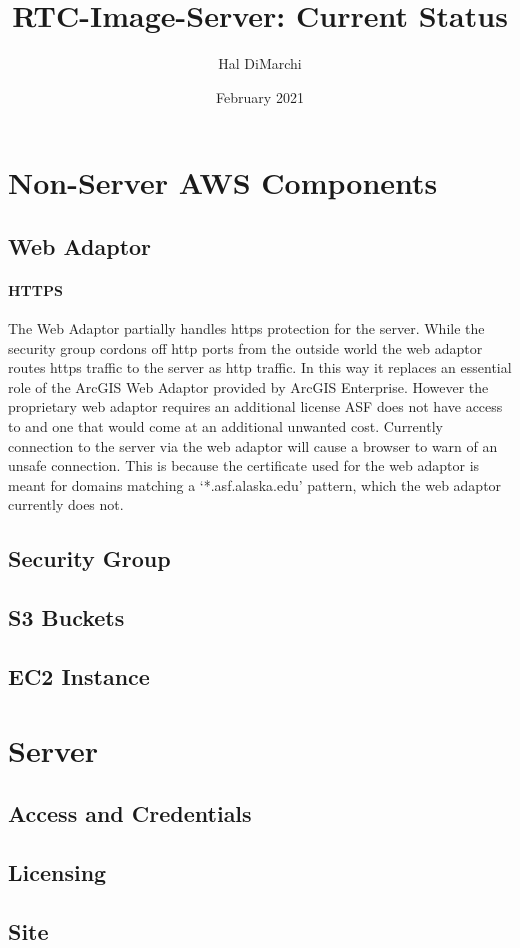 \documentclass[11pt,legalpaper]{article}
\begin{document}
    \title{RTC-Image-Server: Current Status}
    \author{Hal DiMarchi}
    \date{February 2021}
    \maketitle
    \newpage
    \tableofcontents
    \newpage
    \section{Non-Server AWS Components}
      \subsection{Web Adaptor}
        \begin{addmargin}[1em]{2em}
        \paragraph{HTTPS \newline}
          The Web Adaptor partially handles https protection for the server. While the security group cordons off http ports from the outside world the web adaptor routes https traffic to the server as http traffic. In this way it replaces an essential role of the ArcGIS Web Adaptor provided by ArcGIS Enterprise. However the proprietary web adaptor requires an additional license ASF does not have access to and one that would come at an additional unwanted cost. Currently connection to the server via the web adaptor will cause a browser to warn of an unsafe connection. This is because the certificate used for the web adaptor is meant for domains matching a `*.asf.alaska.edu' pattern, which the web adaptor currently does not.
        \end{addmargin}
      \subsection{Security Group}
      \subsection{S3 Buckets}
      \subsection{EC2 Instance}
    \section{Server}
      \subsection{Access and Credentials}
      \subsection{Licensing}
      \subsection{Site}
\end{document}

